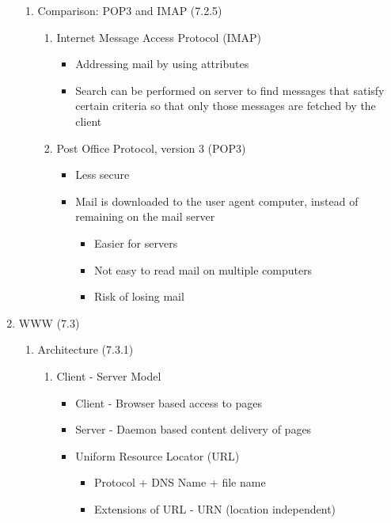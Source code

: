 \documentclass[a4paper,10pt]{article}
\begin{document}
\begin{enumerate}
\begin{enumerate}
      \item Comparison: POP3 and IMAP (7.2.5)
        \begin{enumerate}
          \item Internet Message Access Protocol (IMAP)
            \begin{itemize}
              \item Addressing mail by using attributes
              \item Search can be performed on server to find messages that satisfy certain criteria so that only those messages are fetched by the client
            \end{itemize}
          \item Post Office Protocol, version 3 (POP3)
            \begin{itemize}
              \item Less secure
              \item Mail is downloaded to the user agent computer, instead of remaining on the mail server
                \begin{itemize}
                  \item Easier for servers
                  \item Not easy to read mail on multiple computers
                  \item Risk of losing mail
                \end{itemize}
            \end{itemize}
        \end{enumerate}
    \end{enumerate}
  \item WWW (7.3)
    \begin{enumerate}
      \item Architecture (7.3.1)
        \begin{enumerate}
          \item Client - Server Model
            \begin{itemize}
              \item Client - Browser based access to pages
              \item Server - Daemon based content delivery of pages
              \item Uniform Resource Locator (URL)
                \begin{itemize}
                  \item Protocol + DNS Name + file name
                  \item Extensions of URL - URN (location independent)

\end{itemize}
\end{itemize}
\end{enumerate}
\end{enumerate}
\end{enumerate}
\end{document}
